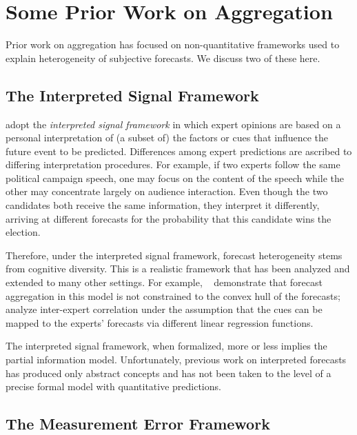 \documentclass[11pt]{article}
\theoremstyle{definition}
\theoremstyle{definition}
\begin{document}
\section{Some Prior Work on Aggregation}
\label{sec:prior}

Prior work on aggregation has focused on non-quantitative
frameworks used to explain heterogeneity of subjective forecasts.  
We discuss two of these here.

\subsection{The Interpreted Signal Framework}
\label{ss:inerpreted}

\citet{hong2009interpreted} adopt the {\em interpreted 
signal framework} in which expert opinions are based on a personal
interpretation of (a subset of) the factors or cues that influence
the future event to be predicted.  Differences among expert
predictions are ascribed to differing interpretation procedures.
For example, if two experts follow the same political campaign
speech, one may focus on the content of the speech while the other 
may concentrate largely on audience interaction.  Even though the
two candidates both receive the same information, they interpret
it differently, arriving at different forecasts for the probability
that this candidate wins the election.  

Therefore, under the interpreted signal framework, forecast heterogeneity 
stems from cognitive diversity.  This is a realistic framework that
has been analyzed and extended to many other settings.  For example,
~\citet{parunak2013characterizing} demonstrate that 
forecast aggregation in this model is not constrained to the convex 
hull of the forecasts;~\citet{broomell2009experts}
analyze inter-expert correlation
under the assumption that the cues can be mapped to the experts'
forecasts via different linear regression functions.

The interpreted signal framework, when formalized, more or less implies 
the partial information model.  Unfortunately, previous work on
interpreted forecasts has produced only abstract concepts and 
has not been taken to the level of a precise formal model with 
quantitative predictions.  

\subsection{The Measurement Error Framework}
\label{ss:measurement}
\end{document}
